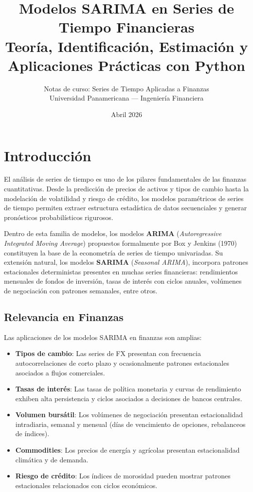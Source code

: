 \documentclass[12pt,a4paper]{article}
\title{
  \vspace{-1cm}
  {\Large \textbf{Modelos SARIMA en Series de Tiempo Financieras}} \\[0.6em]
  {\normalsize Teoría, Identificación, Estimación y Aplicaciones Prácticas con Python}
}
\author{
  \normalsize Notas de curso: Series de Tiempo Aplicadas a Finanzas \\
  \normalsize Universidad Panamericana --- Ingeniería Financiera
}
\date{\normalsize Abril 2026}
\begin{document}

\maketitle
\thispagestyle{fancy}
\tableofcontents
\newpage

\section{Introducción}

El análisis de series de tiempo es uno de los pilares fundamentales de las finanzas cuantitativas.
Desde la predicción de precios de activos y tipos de cambio hasta la modelación de volatilidad y
riesgo de crédito, los modelos paramétricos de series de tiempo permiten extraer estructura
estadística de datos secuenciales y generar pronósticos probabilísticos rigurosos.

Dentro de esta familia de modelos, los modelos \textbf{ARIMA} (\textit{Autoregressive Integrated
Moving Average}) propuestos formalmente por Box y Jenkins (1970) constituyen la base de la
econometría de series de tiempo univariadas. Su extensión natural, los modelos
\textbf{SARIMA} (\textit{Seasonal ARIMA}), incorpora patrones estacionales deterministas
presentes en muchas series financieras: rendimientos mensuales de fondos de inversión,
tasas de interés con ciclos anuales, volúmenes de negociación con patrones semanales, entre
otros.

\subsection{Relevancia en Finanzas}

Las aplicaciones de los modelos SARIMA en finanzas son amplias:

\begin{itemize}[leftmargin=*]
  \item \textbf{Tipos de cambio}: Las series de FX presentan con frecuencia autocorrelaciones
        de corto plazo y ocasionalmente patrones estacionales asociados a flujos comerciales.
  \item \textbf{Tasas de interés}: Las tasas de política monetaria y curvas de rendimiento
        exhiben alta persistencia y ciclos asociados a decisiones de bancos centrales.
  \item \textbf{Volumen bursátil}: Los volúmenes de negociación presentan estacionalidad
        intradiaria, semanal y mensual (días de vencimiento de opciones, rebalanceos de índices).
  \item \textbf{Commodities}: Los precios de energía y agrícolas presentan estacionalidad
        climática y de demanda.
  \item \textbf{Riesgo de crédito}: Los índices de morosidad pueden mostrar patrones
        estacionales relacionados con ciclos económicos.
\end{itemize}
\end{document}
